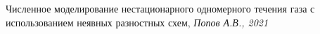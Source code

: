 \documentclass[specialist, subf, href, colorlinks=true, 14pt, times, mtpro, final]{disser}
\theoremstyle{definition}
\begin{document}
	
	
	\tableofcontents
	\newpage
	
	
	
	
	
	
	
	
	
	
	
	
	

	\newpage
	\begin{thebibliography}{100}
		 Численное моделирование нестационарного одномерного течения газа с использованием неявных разностных схем, \emph{Попов А.В., 2021}

	\end{thebibliography}
\end{document}
